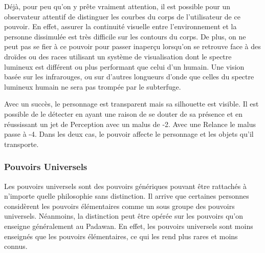 \begin{description}[align=left]
        Déjà, pour peu qu'on y prête vraiment attention, il est possible pour un observateur attentif de distinguer les courbes du corps de l'utilisateur de ce pouvoir. En effet, assurer la continuité visuelle entre l'environnement et la personne dissimulée est très difficile sur les contours du corps. De plus, on ne peut pas se fier à ce pouvoir pour passer inaperçu lorsqu'on se retrouve face à des droïdes ou des races utilisant un système de visualisation dont le spectre lumineux est différent ou plus performant que celui d'un humain. Une vision basée sur les infrarouges, ou sur d'autres longueurs d'onde que celles du spectre lumineux humain ne sera pas trompée par le subterfuge.

        Avec un succès, le personnage est transparent mais sa silhouette est visible. Il est possible de le détecter en ayant une raison de se douter de sa présence et en réussissant un jet de Perception avec un malus de -2. Avec une Relance le malus passe à -4. Dans les deux cas, le pouvoir affecte le personnage et les objets qu’il transporte.
        \\

\end{description}

\subsubsection{Pouvoirs Universels}

Les pouvoirs universels sont des pouvoirs génériques pouvant être rattachés à n'importe quelle philosophie sans distinction. Il arrive que certaines personnes considèrent les pouvoirs élémentaires comme un sous groupe des pouvoirs universels. Néanmoins, la distinction peut être opérée sur les pouvoirs qu'on enseigne généralement au Padawan. En effet, les pouvoirs universels sont moins enseignés que les pouvoirs élémentaires, ce qui les rend plus rares et moins connus. 

